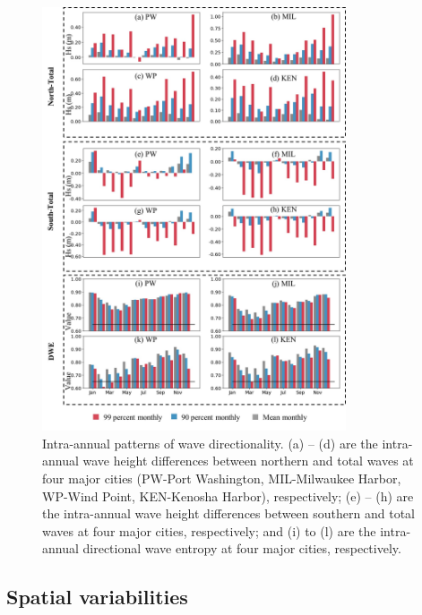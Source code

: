 \begin{figure}[htbp]
  \centering
  \includegraphics[width=0.8\textwidth]{chapter3/resources/figure3-6.jpg}
  \caption{Intra-annual patterns of wave directionality. (a) – (d) are the intra-annual wave height differences between northern and total waves at four major cities (PW-Port Washington, MIL-Milwaukee Harbor, WP-Wind Point, KEN-Kenosha Harbor), respectively; (e) – (h) are the intra-annual wave height differences between southern and total waves at four major cities, respectively; and (i) to (l) are the intra-annual directional wave entropy at four major cities, respectively.}
  \label{fig:fig3.6}
\end{figure}

\subsection{Spatial variabilities}
\label{Spatial variabilities}

